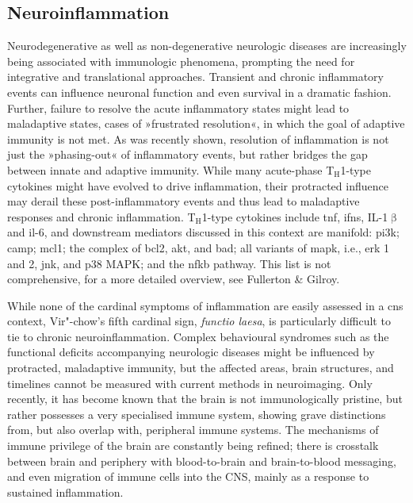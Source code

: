 \subsection{Neuroinflammation}
Neurodegenerative as well as non-degenerative neurologic diseases are increasingly being associated with immunologic phenomena, prompting the need for integrative and translational approaches.\cite{Lurie2018} Transient and chronic inflammatory events can influence neuronal function and even survival in a dramatic fashion. Further, failure to resolve the acute inflammatory states might lead to maladaptive states, cases of »frustrated resolution«,\cite{Fullerton2016} in which the goal of adaptive immunity is not met. As was recently shown,\cite{Newson2014} resolution of inflammation is not just the »phasing-out« of inflammatory events, but rather bridges the gap between innate and adaptive immunity. While many acute-phase T$_\mathrm{H}$1-type cytokines might have evolved to drive inflammation, their protracted influence may derail these post-inflammatory events and thus lead to maladaptive responses and chronic inflammation. T$_\mathrm{H}$1-type cytokines include \ac{tnf}, \acp{ifn}, IL-1$\upbeta$ and \ac{il}-6, and downstream mediators discussed in this context are manifold: \ac{pi3k}; \ac{camp}; \ac{mcl1}; the complex of \ac{bcl2}, \ac{akt}, and \ac{bad}; all variants of \ac{mapk}, i.e., \ac{erk} 1 and 2, \ac{jnk}, and p38 MAPK; and the \ac{nfkb} pathway. This list is not comprehensive, for a more detailed overview, see Fullerton \& Gilroy.\cite{Fullerton2016}

While none of the cardinal symptoms of inflammation are easily assessed in a \ac{cns} context, Vir"-chow's fifth cardinal sign, \emph{functio laesa}, is particularly difficult to tie to chronic neuroinflammation. Complex behavioural syndromes such as the functional deficits accompanying neurologic diseases might be influenced by protracted, maladaptive immunity, but the affected areas, brain structures, and timelines cannot be measured with current methods in neuroimaging. Only recently, it has become known that the brain is not immunologically pristine, but rather possesses a very specialised immune system, showing grave distinctions from, but also overlap with, peripheral immune systems.\cite{Louveau2015, Negi2018} The mechanisms of immune privilege of the brain are constantly being refined; there is crosstalk between brain and periphery with blood-to-brain and brain-to-blood messaging,\cite{Dantzer2018} and even migration of immune cells into the CNS, mainly as a response to sustained inflammation.

